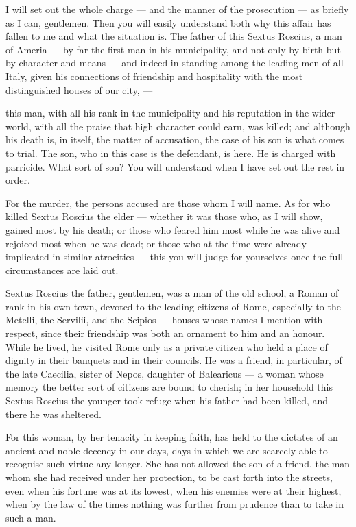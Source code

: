  I will set out the whole charge --- and the manner of the prosecution --- as briefly as I can, gentlemen. Then you will easily understand both why this affair has fallen to me and what the situation is. The father of this Sextus Roscius, a man of Ameria --- by far the first man in his municipality, and not only by birth but by character and means --- and indeed in standing among the leading men of all Italy, given his connections of friendship and hospitality with the most distinguished houses of our city, ---

 this man, with all his rank in the municipality and his reputation in the wider world, with all the praise that high character could earn, was killed; and although his death is, in itself, the matter of accusation, the case of his son is what comes to trial. The son, who in this case is the defendant, is here. He is charged with parricide. What sort of son? You will understand when I have set out the rest in order.

 For the murder, the persons accused are those whom I will name. As for who killed Sextus Roscius the elder --- whether it was those who, as I will show, gained most by his death; or those who feared him most while he was alive and rejoiced most when he was dead; or those who at the time were already implicated in similar atrocities --- this you will judge for yourselves once the full circumstances are laid out.

 Sextus Roscius the father, gentlemen, was a man of the old school, a Roman of rank in his own town, devoted to the leading citizens of Rome, especially to the Metelli, the Servilii, and the Scipios --- houses whose names I mention with respect, since their friendship was both an ornament to him and an honour. While he lived, he visited Rome only as a private citizen who held a place of dignity in their banquets and in their councils. He was a friend, in particular, of the late Caecilia, sister of Nepos, daughter of Balearicus --- a woman whose memory the better sort of citizens are bound to cherish; in her household this Sextus Roscius the younger took refuge when his father had been killed, and there he was sheltered.

 For this woman, by her tenacity in keeping faith, has held to the dictates of an ancient and noble decency in our days, days in which we are scarcely able to recognise such virtue any longer. She has not allowed the son of a friend, the man whom she had received under her protection, to be cast forth into the streets, even when his fortune was at its lowest, when his enemies were at their highest, when by the law of the times nothing was further from prudence than to take in such a man.

